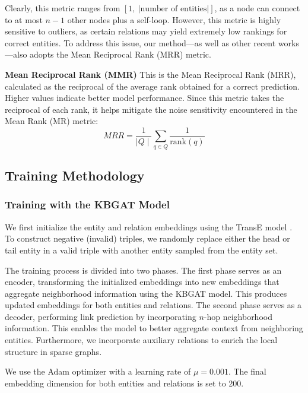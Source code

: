 Clearly, this metric ranges from \([1,~|\text{number of entities}|]\), as a node can connect to at most \(n-1\) other nodes plus a self-loop. However, this metric is highly sensitive to outliers, as certain relations may yield extremely low rankings for correct entities. To address this issue, our method—as well as other recent works—also adopts the Mean Reciprocal Rank (MRR) metric.


\textbf{Mean Reciprocal Rank (MMR)}
This is the Mean Reciprocal Rank (MRR), calculated as the reciprocal of the average rank obtained for a correct prediction. Higher values indicate better model performance. Since this metric takes the reciprocal of each rank, it helps mitigate the noise sensitivity encountered in the Mean Rank (MR) metric:
\[
MRR =\frac{1}{\mid Q \mid} \sum_{q \in Q} \frac{1}{\text{rank}(q)}
\]

\subsection{Training Methodology}


\subsubsection{Training with the KBGAT Model}

We first initialize the entity and relation embeddings using the TransE model \cite{bordes2013translating}. To construct negative (invalid) triples, we randomly replace either the head or tail entity in a valid triple with another entity sampled from the entity set.

The training process is divided into two phases. The first phase serves as an encoder, transforming the initialized embeddings into new embeddings that aggregate neighborhood information using the KBGAT model. This produces updated embeddings for both entities and relations. The second phase serves as a decoder, performing link prediction by incorporating $n$-hop neighborhood information. This enables the model to better aggregate context from neighboring entities. Furthermore, we incorporate auxiliary relations to enrich the local structure in sparse graphs.

We use the Adam optimizer with a learning rate of $\mu = 0.001$. The final embedding dimension for both entities and relations is set to 200. 


